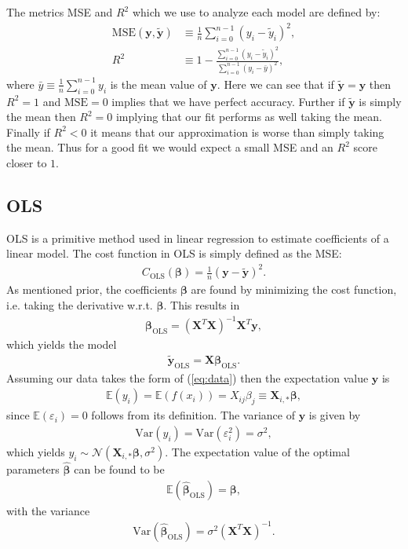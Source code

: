 \documentclass[%
reprint,
amsmath,amssymb,
aps,
pra,
]{revtex4-2}
\newcommand{\f}[2]{\frac{#1}{#2}}
\begin{document}
The metrics MSE and $R^2$ which we use to analyze each model are defined by:
\begin{align}
	\text{MSE}(\bm y,\tilde{\bm{y}})&\equiv\frac{1}{n}\sum_{i=0}^{n-1}(y_i-\tilde y_i)^2,\\
	R^2&\equiv1-\frac{\sum_{i=0}^{n-1}(y_i-\tilde y_i)^2}{\sum_{i=0}^{n-1}(y_i-\bar y)^2},
\end{align}
where $\bar y\equiv\frac{1}{n}\sum_{i=0}^{n-1}y_i$ is the mean value of $\bm y$. Here we can see that if $\tilde{\bm{y}}=\bm y$ then $R^2=1$ and $\text{MSE}=0$ implies that we have perfect accuracy. Further if $\tilde{\bm{y}}$ is simply the mean then $R^2=0$ implying that our fit performs as well taking the mean. Finally if $R^2<0$ it means that our approximation is worse than simply taking the mean. Thus for a good fit we would expect a small MSE and an $R^2$ score closer to $1$.

\subsection{OLS}	
\label{sec:THEORY_OLS}
OLS is a primitive method used in linear regression to estimate coefficients of a linear model. The cost function in OLS is simply defined as the MSE:
\begin{align}
	C_\text{OLS}(\bm\beta)=\f1n(\bm y-\tilde{\bm y})^2.
	\label{eq:cost_ols}
\end{align}
As mentioned prior, the coefficients $\bm\beta$ are found by minimizing the cost function, i.e. taking the derivative w.r.t. $\bm\beta$. This results in
\begin{align}
	\bm\beta_\text{OLS}=(\bm X^T\bm X)^{-1}\bm X^T\bm y,
	\label{eq:beta_ols}
\end{align}
which yields the model
\begin{align}
	\tilde{\bm y}_\text{OLS}=\bm X\bm \beta_\text{OLS}.
\end{align}
Assuming our data takes the form of (\ref{eq:data}) then the expectation value $\bm y$ is
\begin{align*}
	\mathbb{E}(y_i)=\mathbb{E}(f(x_i))=X_{ij}\beta_j\equiv\bm X_{i,*}\bm\beta,
\end{align*}
since $\mathbb{E}(\varepsilon_i)=0$ follows from its definition. The variance of $\bm y$ is given by
\begin{align*}
	\text{Var}(y_i)=\text{Var}(\varepsilon_i^2)=\sigma^2,
\end{align*}
which yields $y_i\sim\mathcal{N}(\bm X_{i,*}\bm\beta,\sigma^2)$. The expectation value of the optimal parameters $\hat{\bm\beta}$ can be found to be
\begin{align*}
	\mathbb{E}(\hat{\bm\beta}_\text{OLS})=\bm\beta,
\end{align*}
with the variance
\begin{align*}
	\text{Var}(\hat{\bm\beta}_\text{OLS})=\sigma^2(\bm X^T \bm X)^{-1}.
\end{align*}
\end{document}
